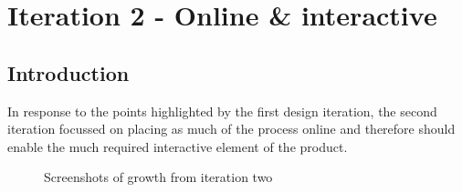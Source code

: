 \documentclass[a4paper,11pt,titlepage]{article}
\begin{document}
\clearpage 

\section{Iteration 2 - Online \& interactive}
	\subsection{Introduction}
	In response to the points highlighted by the first design iteration, the second iteration focussed on placing as much of the process online and therefore should enable the much required interactive element of the product. 
	
	\begin{figure}[H]
    			\centering	
    			\qquad
    			 \qquad
    			\caption{Screenshots of growth from iteration two}%
    			\label{fig:iter2}
	\end{figure}	
	
\end{document}
